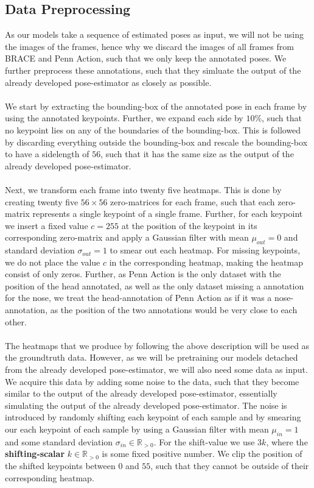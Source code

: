 \documentclass[./main.tex]{subfiles}
\begin{document}
\subsection{Data Preprocessing}
As our models take a sequence of estimated poses as input, we will not be using the images of the frames, hence why we discard the images of all frames from BRACE and Penn Action, such that we only keep the annotated poses. We further preprocess these annotations, such that they simluate the output of the already developed pose-estimator as closely as possible.
\\
\\
We start by extracting the bounding-box of the annotated pose in each frame by using the annotated keypoints. Further, we expand each side by $10\%$, such that no keypoint lies on any of the boundaries of the bounding-box. This is followed by discarding everything outside the bounding-box and rescale the bounding-box to have a sidelength of $56$, such that it has the same size as the output of the already developed pose-estimator.
\\
\\
Next, we transform each frame into twenty five heatmaps. This is done by creating twenty five $56 \times 56$ zero-matrices for each frame, such that each zero-matrix represents a single keypoint of a single frame. Further, for each keypoint we insert a fixed value $c = 255$ at the position of the keypoint in its corresponding zero-matrix and apply a Gaussian filter with mean $\mu_{out} = 0$ and standard deviation $\sigma_{out} = 1$ to smear out each heatmap. For missing keypoints, we do not place the value $c$ in the corresponding heatmap, making the heatmap consist of only zeros. Further, as Penn Action is the only dataset with the position of the head annotated, as well as the only dataset missing a annotation for the nose, we treat the head-annotation of Penn Action as if it was a nose-annotation, as the position of the two annotations would be very close to each other.
\\
\\
The heatmaps that we produce by following the above description will be used as the groundtruth data. However, as we will be pretraining our models detached from the already developed pose-estimator, we will also need some data as input. We acquire this data by adding some noise to the data, such that they become similar to the output of the already developed pose-estimator, essentially simulating the output of the already developed pose-estimator. The noise is introduced by randomly shifting each keypoint of each sample and by smearing our each keypoint of each sample by using a Gaussian filter with mean $\mu_{in} = 1$ and some standard deviation $\sigma_{in} \in \mathbb{R}_{>0}$. For the shift-value we use $3k$, where the \textbf{shifting-scalar} $k \in \mathbb{R}_{>0}$ is some fixed positive number. We clip the position of the shifted keypoints between $0$ and $55$, such that they cannot be outside of their corresponding heatmap. 
\end{document}
